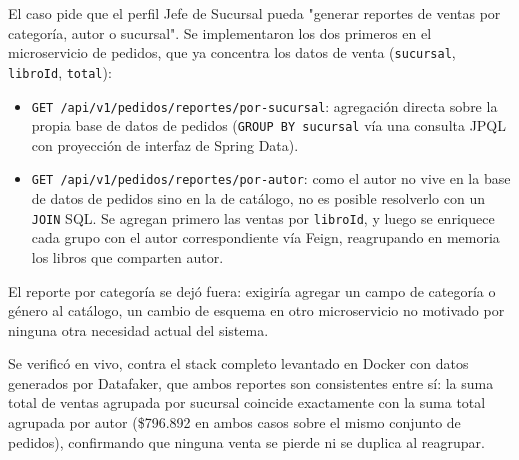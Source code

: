 El caso pide que el perfil Jefe de Sucursal pueda "generar reportes de ventas por
categoría, autor o sucursal". Se implementaron los dos primeros en el microservicio de
pedidos, que ya concentra los datos de venta (\texttt{sucursal}, \texttt{libroId},
\texttt{total}):

\begin{itemize}
    \item \texttt{GET /api/v1/pedidos/reportes/por-sucursal}: agregación directa sobre
    la propia base de datos de pedidos (\texttt{GROUP BY sucursal} vía una consulta
    JPQL con proyección de interfaz de Spring Data).
    \item \texttt{GET /api/v1/pedidos/reportes/por-autor}: como el autor no vive en la
    base de datos de pedidos sino en la de catálogo, no es posible resolverlo con un
    \texttt{JOIN} SQL. Se agregan primero las ventas por \texttt{libroId}, y luego se
    enriquece cada grupo con el autor correspondiente vía Feign, reagrupando en memoria
    los libros que comparten autor.
\end{itemize}

El reporte por categoría se dejó fuera: exigiría agregar un campo de categoría o
género al catálogo, un cambio de esquema en otro microservicio no motivado por ninguna
otra necesidad actual del sistema.

Se verificó en vivo, contra el stack completo levantado en Docker con datos generados
por Datafaker, que ambos reportes son consistentes entre sí: la suma total de ventas
agrupada por sucursal coincide exactamente con la suma total agrupada por autor
(\$796.892 en ambos casos sobre el mismo conjunto de pedidos), confirmando que ninguna
venta se pierde ni se duplica al reagrupar.

